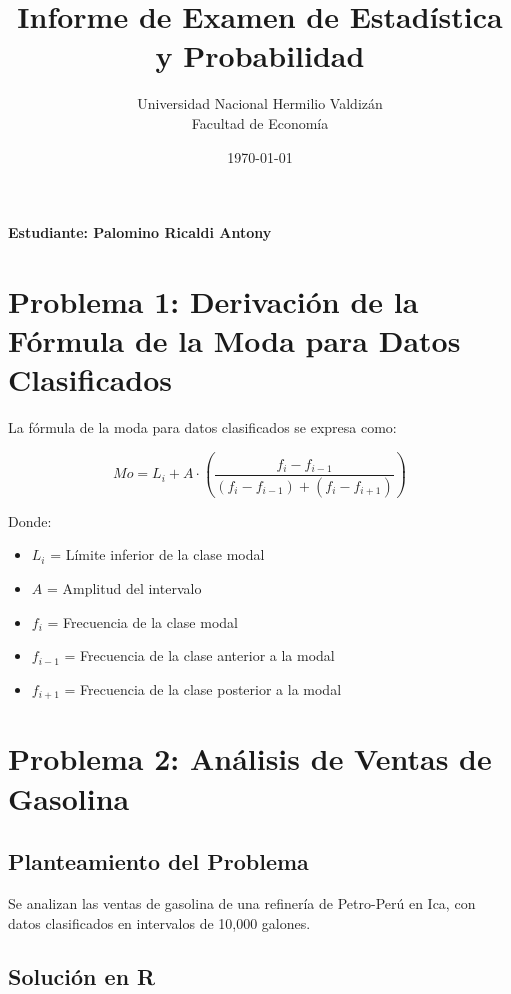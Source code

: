 \documentclass[12pt, a4paper]{article}
\title{Informe de Examen de Estadística y Probabilidad}
\author{Universidad Nacional Hermilio Valdizán\\Facultad de Economía}
\date{\today}
\begin{document}
\maketitle

\textbf{Estudiante: Palomino Ricaldi Antony}

\section{Problema 1: Derivación de la Fórmula de la Moda para Datos Clasificados}

La fórmula de la moda para datos clasificados se expresa como:

\[Mo = L_i + A \cdot \left(\frac{f_i - f_{i-1}}{(f_i - f_{i-1}) + (f_i - f_{i+1})}\right)\]

Donde:
\begin{itemize}
    \item $L_i$ = Límite inferior de la clase modal
    \item $A$ = Amplitud del intervalo
    \item $f_i$ = Frecuencia de la clase modal
    \item $f_{i-1}$ = Frecuencia de la clase anterior a la modal
    \item $f_{i+1}$ = Frecuencia de la clase posterior a la modal
\end{itemize}

\section{Problema 2: Análisis de Ventas de Gasolina}

\subsection{Planteamiento del Problema}
Se analizan las ventas de gasolina de una refinería de Petro-Perú en Ica, con datos clasificados en intervalos de 10,000 galones.

\subsection{Solución en R}
\end{document}
